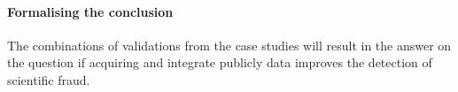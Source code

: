 \documentclass{ou-report}
\newcommand{\outline}[1]{{\color{blue} #1}}
\begin{document}
\paragraph{Formalising the conclusion}
The combinations of validations from the case studies will result in the
answer on the question if acquiring and integrate publicly data improves
the detection of scientific fraud.


    
    
    
    
    
    

    
\end{document}

